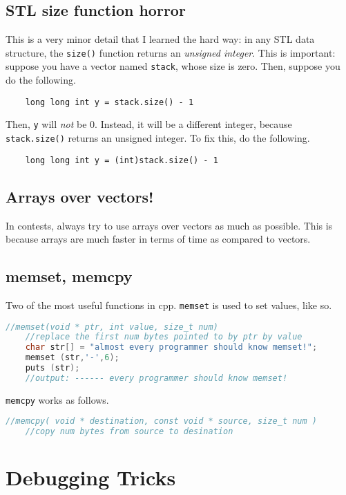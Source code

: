 \documentclass[12pt,a4paper]{amsart}
\numberwithin{equation}{section}
\theoremstyle{definition}
\begin{document}
\subsection{STL size function horror} This is a very minor detail that I learned the hard way: in any STL data structure, the \verb|size()| function returns an \textit{unsigned integer}. This is important: suppose you have a vector named \verb|stack|, whose size is zero. Then, suppose you do the following. 
\begin{verbatim}
    long long int y = stack.size() - 1
\end{verbatim}
Then, \verb|y| will \textit{not} be 0. Instead, it will be a different integer, because \verb|stack.size()| returns an unsigned integer. To fix this, do the following. 
\begin{verbatim}
    long long int y = (int)stack.size() - 1
\end{verbatim}

\subsection{Arrays over vectors!} In contests, always try to use arrays over vectors as much as possible. This is because arrays are much faster in terms of time as compared to vectors. 

\subsection{memset, memcpy} Two of the most useful functions in cpp. \verb|memset| is used to set values, like so. 
\begin{lstlisting}[language=C++]
    //memset(void * ptr, int value, size_t num)
    //replace the first num bytes pointed to by ptr by value 
    char str[] = "almost every programmer should know memset!";
    memset (str,'-',6);
    puts (str);
    //output: ------ every programmer should know memset!
\end{lstlisting}

\verb|memcpy| works as follows. 

\begin{lstlisting}[language=C++]
    //memcpy( void * destination, const void * source, size_t num )
    //copy num bytes from source to desination
\end{lstlisting}

\section{Debugging Tricks}
\end{document}
